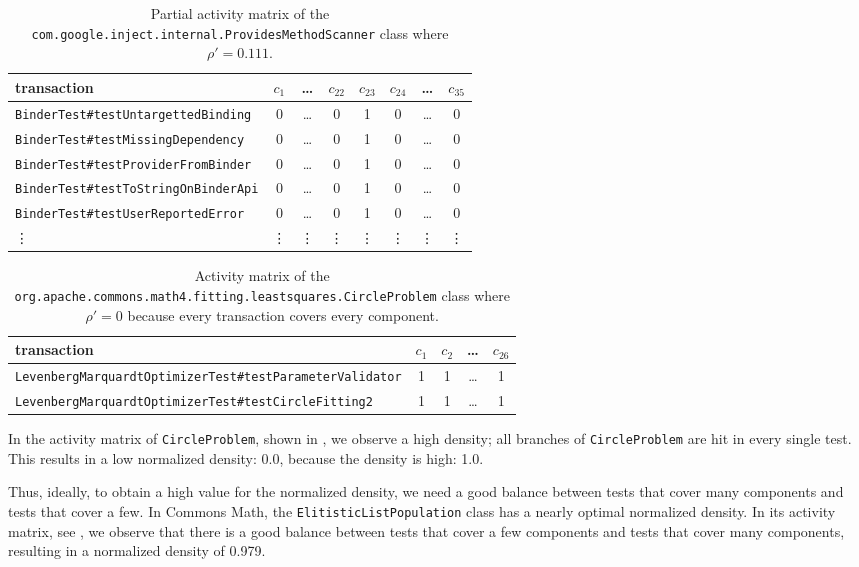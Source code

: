 \documentclass[twoside,a4paper,11pt]{memoir}
\begin{document}
\begin{table}[]
\scriptsize
\centering
\caption{Partial activity matrix of the \texttt{com.google.\-inject.\-internal.\-Provides\-Method\-Scanner} class where \(\rho' = 0.111\).}%
\label{tab:providesmethodscanner}
\begin{tabular}{l|ccccccc}
transaction & \(c_1 \) & \dots & \(c_{22} \) & \(c_{23} \) & \(c_{24} \) & \dots & \(c_{35} \) \\ \hline
\texttt{BinderTest\#testUntargettedBinding} & 0 & \dots & 0 & 1 & 0 & \dots & 0 \\
\texttt{BinderTest\#testMissingDependency} & 0 & \dots & 0 & 1 & 0 & \dots & 0 \\
\texttt{BinderTest\#testProviderFromBinder} & 0 & \dots & 0 & 1 & 0 & \dots & 0 \\
\texttt{BinderTest\#testToStringOnBinderApi} & 0 & \dots & 0 & 1 & 0 & \dots & 0 \\
\texttt{BinderTest\#testUserReportedError} & 0 & \dots & 0 & 1 & 0 & \dots & 0 \\
\vdots & \vdots & \vdots & \vdots & \vdots & \vdots & \vdots & \vdots
\end{tabular}
\end{table}

\begin{table}[]
\scriptsize
\centering
\caption{Activity matrix of the \texttt{org.apache.commons.math4.fitting.leastsquares.CircleProblem} class where \(\rho' = 0\) because every transaction covers every component.}%
\label{tab:circleproblem}
\begin{tabular}{l|cccc}
transaction & \(c_1 \) & \(c_2 \) & \dots & \(c_{26} \) \\ \hline
\texttt{LevenbergMarquardtOptimizerTest\#testParameterValidator} & 1 & 1 & \dots & 1 \\
\texttt{LevenbergMarquardtOptimizerTest\#testCircleFitting2} & 1 & 1 & \dots & 1
\end{tabular}
\end{table}

In the activity matrix of \texttt{Circle\-Problem}, shown in , we observe a high density; all branches of \texttt{Circle\-Problem} are hit in every single test.
This results in a low normalized density: 0.0, because the density is high: 1.0.

Thus, ideally, to obtain a high value for the normalized density, we need a good balance between tests that cover many components and tests that cover a few.
In Commons Math, the \texttt{Elitistic\-List\-Population} class has a nearly optimal normalized density.
In its activity matrix, see , we observe that there is a good balance between tests that cover a few components and tests that cover many components, resulting in a normalized density of 0.979.
\end{document}
